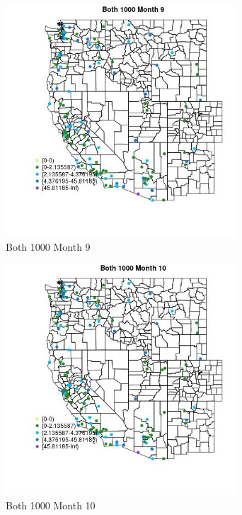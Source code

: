 \begin{figure} 
\centering  
\includegraphics[width=0.77\textwidth]{Code_Outputs/Report_ML_input_PM25_Step4_part_e_de_duplicated_aves_MapObsMo9Both_1000.jpg} 
\caption{\label{fig:Report_ML_input_PM25_Step4_part_e_de_duplicated_avesMapObsMo9Both_1000}Both 1000 Month 9} 
\end{figure} 
 

\begin{figure} 
\centering  
\includegraphics[width=0.77\textwidth]{Code_Outputs/Report_ML_input_PM25_Step4_part_e_de_duplicated_aves_MapObsMo10Both_1000.jpg} 
\caption{\label{fig:Report_ML_input_PM25_Step4_part_e_de_duplicated_avesMapObsMo10Both_1000}Both 1000 Month 10} 
\end{figure} 
 

